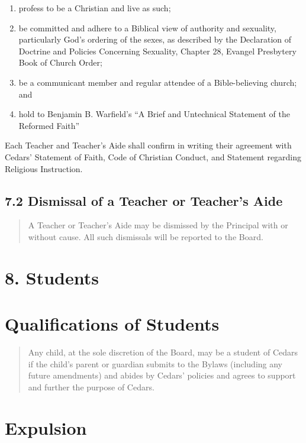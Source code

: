 \documentclass[
]{book}
\providecommand{\tightlist}{%
  \setlength{\itemsep}{0pt}\setlength{\parskip}{0pt}}
\begin{document}
\begin{enumerate}
\def\labelenumi{\alph{enumi}.}
\tightlist
\item
  profess to be a Christian and live as such;
\item
  be committed and adhere to a Biblical view of authority and sexuality, particularly God's ordering of the sexes, as described by the Declaration of Doctrine and Policies Concerning Sexuality, Chapter 28, Evangel Presbytery Book of Church Order;
\item
  be a communicant member and regular attendee of a Bible-believing church; and
\item
  hold to Benjamin B. Warfield's ``A Brief and Untechnical Statement of the Reformed Faith''
\end{enumerate}

Each Teacher and Teacher's Aide shall confirm in writing their agreement with Cedars' Statement of Faith, Code of Christian Conduct, and Statement regarding Religious Instruction.

\subsection{7.2 Dismissal of a Teacher or Teacher's Aide}\label{dismissal-of-a-teacher-or-teachers-aide}

\begin{quote}
A Teacher or Teacher's Aide may be dismissed by the Principal with or
without cause. All such dismissals will be reported to the Board.
\end{quote}

\section{8. Students}\label{students}

\section{Qualifications of Students}\label{qualifications-of-students}

\begin{quote}
Any child, at the sole discretion of the Board, may be a student of
Cedars if the child's parent or guardian submits to the Bylaws
(including any future amendments) and abides by Cedars' policies and
agrees to support and further the purpose of Cedars.
\end{quote}

\section{Expulsion}\label{expulsion}
\end{document}
